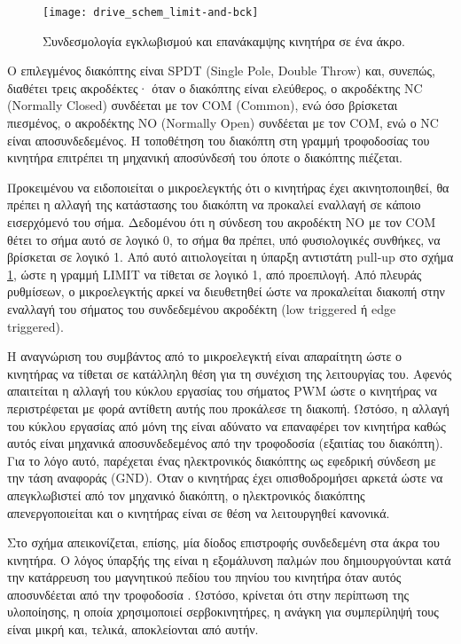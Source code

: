 \begin{figure}
    \caption{Συνδεσμολογία εγκλωβισμού και επανάκαμψης κινητήρα σε ένα άκρο.
    \label{fig:motor:limit_switch}}
    \begin{center}
    \texttt{[image: drive\_schem\_limit-and-bck]}
    \end{center}
\end{figure}

Ο επιλεγμένος διακόπτης είναι SPDT (\textenglish{Single Pole, Double Throw})
και, συνεπώς, διαθέτει τρεις ακροδέκτες· όταν ο διακόπτης είναι ελεύθερος, ο
ακροδέκτης NC (\textenglish{Normally Closed}) συνδέεται με τον COM
(\textenglish{Common}), ενώ όσο βρίσκεται πιεσμένος, ο ακροδέκτης NO
(\textenglish{Normally Open}) συνδέεται με τον COM, ενώ ο NC είναι
αποσυνδεδεμένος. Η τοποθέτηση του διακόπτη στη γραμμή τροφοδοσίας του κινητήρα
επιτρέπει τη μηχανική αποσύνδεσή του όποτε ο διακόπτης πιέζεται.

Προκειμένου να ειδοποιείται ο μικροελεγκτής ότι ο κινητήρας έχει ακινητοποιηθεί,
θα πρέπει η αλλαγή της κατάστασης του διακόπτη να προκαλεί εναλλαγή σε κάποιο
εισερχόμενό του σήμα. Δεδομένου ότι η σύνδεση του ακροδέκτη NO με τον COM θέτει
το σήμα αυτό σε λογικό 0, το σήμα θα πρέπει, υπό φυσιολογικές συνθήκες, να
βρίσκεται σε λογικό 1. Από αυτό αιτιολογείται η ύπαρξη αντιστάτη pull-up στο
σχήμα \ref{fig:motor:limit_switch}, ώστε η γραμμή LIMIT να τίθεται σε λογικό 1,
από προεπιλογή. Από πλευράς ρυθμίσεων, ο μικροελεγκτής αρκεί να διευθετηθεί ώστε
να προκαλείται διακοπή στην εναλλαγή του σήματος του συνδεδεμένου ακροδέκτη
(\textenglish{low triggered} ή \textenglish{edge triggered}).

Η αναγνώριση του συμβάντος από το μικροελεγκτή είναι απαραίτητη ώστε ο κινητήρας
να τίθεται σε κατάλληλη θέση για τη συνέχιση της λειτουργίας του. Αφενός
απαιτείται η αλλαγή του κύκλου εργασίας του σήματος PWM ώστε ο κινητήρας να
περιστρέφεται με φορά αντίθετη αυτής που προκάλεσε τη διακοπή. Ωστόσο, η αλλαγή
του κύκλου εργασίας από μόνη της είναι αδύνατο να επαναφέρει τον κινητήρα καθώς
αυτός είναι μηχανικά αποσυνδεδεμένος από την τροφοδοσία (εξαιτίας του διακόπτη).
Για το λόγο αυτό, παρέχεται ένας ηλεκτρονικός διακόπτης ως εφεδρική σύνδεση με
την τάση αναφοράς (GND). Όταν ο κινητήρας έχει οπισθοδρομήσει αρκετά ώστε να
απεγκλωβιστεί από τον μηχανικό διακόπτη, ο ηλεκτρονικός διακόπτης
απενεργοποιείται και ο κινητήρας είναι σε θέση να λειτουργηθεί κανονικά.

Στο σχήμα απεικονίζεται, επίσης, μία δίοδος επιστροφής συνδεδεμένη στα άκρα του
κινητήρα. Ο λόγος ύπαρξής της είναι η εξομάλυνση παλμών που δημιουργούνται κατά
την κατάρρευση του μαγνητικού πεδίου του πηνίου του κινητήρα όταν αυτός
αποσυνδέεται από την τροφοδοσία \parencite[130--132]{kuphaldt09semi}. Ωστόσο,
κρίνεται ότι στην περίπτωση της υλοποίησης, η οποία χρησιμοποιεί σερβοκινητήρες,
η ανάγκη για συμπερίληψή τους είναι μικρή και, τελικά, αποκλείονται από αυτήν.

